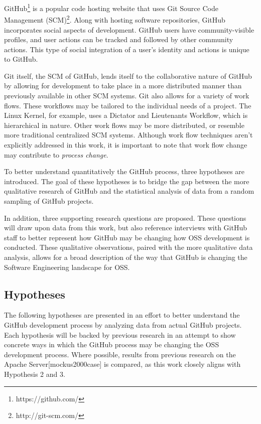 \documentclass{proc}
\begin{document}
GitHub\footnote{https://github.com/} is a popular code hosting website that uses Git Source Code Management (SCM)\footnote{http://git-scm.com/}. Along with hosting software repositories, GitHub incorporates social aspects of development. GitHub users have community-visible profiles, and user actions can be tracked and followed by other community actions. This type of social integration of a user's identity and actions is unique to GitHub\cite{dabbish2012social}. 

Git itself, the SCM of GitHub, lends itself to the collaborative nature of GitHub by allowing for development to take place in a more distributed manner than previously available in other SCM systems\cite{spinellis2012git}.
Git also allows for a variety of work flows\cite{chacon2009pro}. These workflows may be tailored to the individual needs of a project. The Linux Kernel, for example, uses a Dictator and Lieutenants Workflow\cite{platschekfloss}, which is hierarchical in nature. Other work flows may be more distributed, or resemble more traditional centralized SCM systems. Although work flow techniques aren't explicitly addressed in this work, it is important to note that work flow change may contribute to \textit{process change}.

To better understand quantitatively the GitHub process, three hypotheses are introduced. The goal of these hypotheses is to bridge the gap between the more qualitative research of GitHub\cite{dabbish2012social,begel2013social} and the statistical analysis of data from a random sampling of GitHub projects.

In addition, three supporting research questions are proposed. These questions will draw upon data from this work, but also reference interviews with GitHub staff to better represent how GitHub may be changing how OSS development is conducted. These qualitative observations, paired with the more qualitative data analysis, allows for a broad description of the way that GitHub is changing the Software Engineering landscape for OSS.

\subsection{Hypotheses}
The following hypotheses are presented in an effort to better understand the GitHub development process by analyzing data from actual GitHub projects. Each hypothesis will be backed by previous research in an attempt to show concrete ways in which the GitHub process may be changing the OSS development process. Where possible, results from previous research on the Apache Server[mockus2000case] is compared, as this work closely aligns with Hypothesis 2 and 3.\\
\end{document}
